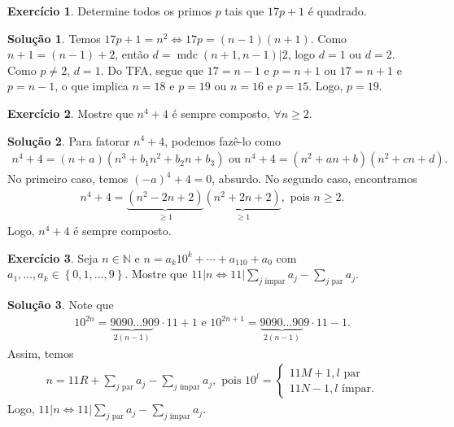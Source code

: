 \documentclass[a4paper,11pt,twoside, leqno]{article}
\DeclareMathOperator{\mdc}{mdc}
\theoremstyle{definition}
\newtheorem{exercise}{Exercício}
\newtheorem*{solution}{Solução}
\begin{document}
\begin{exercise}
	Determine todos os primos $p$ tais que $17p+1$ é quadrado.
\end{exercise}
\begin{solution}
    Temos $17p + 1 = n^2 \Leftrightarrow 17p = (n-1)(n+1)$. Como $n+1 = (n-1)+2$, então $d = \mdc(n+1, n-1)|2$, logo $d = 1$ ou $d = 2$. Como $p\neq 2$, $d=1$. Do TFA, segue que $17 = n-1$ e $p = n+1$ ou $17 = n+1$ e $p = n-1$, o que implica $n = 18$ e $p = 19$ ou $n = 16$ e $p = 15$. Logo, $p=19$.
\end{solution}
\begin{exercise}
	Mostre que $n^4 + 4$ é sempre composto, $\forall n\geq 2$.
\end{exercise}
\begin{solution}
	Para fatorar $n^4 + 4$, podemos fazê-lo como
	\begin{align*}
	n^4 + 4 = (n+a)(n^3 + b_1n^2 + b_2n + b_3) \text{ ou } n^4 + 4 = (n^2 + an + b)(n^2 + cn + d).
	\end{align*}
	No primeiro caso, temos $(-a)^4 + 4 = 0$, absurdo. No segundo caso, encontramos 
	\begin{align*}
	n^4 + 4 = \underbrace{(n^2 - 2n + 2)}_{\geq 1}\underbrace{(n^2 + 2n + 2)}_{\geq 1}, \text{ pois } n\geq 2.
	\end{align*}
	Logo, $n^4 + 4$ é sempre composto.
\end{solution}
\begin{exercise}
	Seja $n\in\mathbb{N}$ e $n = a_k10^k + \cdots + a_110 + a_0$ com $a_1,\dots,a_k\in\left\{ 0,1,\dots,9 \right\}$. Mostre que $11|n \Leftrightarrow 11\Bigg| \displaystyle{ \sum_{j \text{ ímpar}}a_j - \sum_{j \text{ par}}a_j }$.
\end{exercise}
\begin{solution}
	Note que
	\begin{align*}
	10^{2n} = \underbrace{9090\dots 90}_{2(n-1)}9\cdot 11 + 1 \text{ e } 10^{2n+1} = \underbrace{9090\dots 90}_{2(n-1)}9\cdot 11 - 1.
	\end{align*}
	Assim, temos
	\begin{align*}
	n = 11R + \sum_{j \text{ par}}a_j - \sum_{j \text{ ímpar}}a_j, \text{ pois } 10^l = \begin{cases}
	11M + 1, l\text{ par} \\
	11N - 1, l\text{ ímpar}.
	\end{cases}
	\end{align*}
	Logo, $11|n \Leftrightarrow 11\Bigg| \displaystyle{ \sum_{j \text{ par}}a_j - \sum_{j \text{ ímpar}}a_j }$.
\end{solution}
\end{document}
